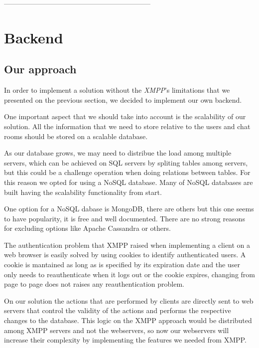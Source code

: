 ---------------------------------------------------------------

\section{Backend}


\subsection{Our approach}

In order to implement a solution without the \textit{XMPP}'s limitations that we presented on the previous section, we decided to implement our own backend. 

One important aspect that we should take into account is the scalability of our solution. All the information that we need to store relative to the users and chat rooms should be stored on a scalable database. 

As our database grows, we may need to distribue the load among multiple servers, which can be achieved on SQL servers by spliting tables among servers, but this could be a challenge operation when doing relations between tables. For this reason we opted for using a NoSQL database. Many of NoSQL databases are built having the scalability functionality from start.

One option for a NoSQL dabase is MongoDB, there are others but this one seems to have popularity, it is free and well documented. There are no strong reasons for excluding options like Apache Cassandra or others.

The authentication problem that XMPP raised when implementing a client on a web browser is easily solved by using cookies to identify authenticated users. A cookie is mantained as long as is specified by its expiration date and the user only needs to reauthenticate when it logs out or the cookie expires, changing from page to page does not raises any reauthentication problem.

On our solution the actions that are performed by clients are directly sent to web servers that control the validity of the actions and performs the respective changes to the database. This logic on the XMPP approach would be distributed among XMPP servers and not the webservers, so now our webservers will increase their complexity by implementing the features we needed from XMPP.

